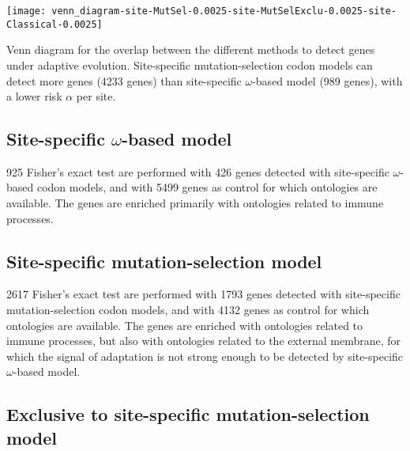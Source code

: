 \documentclass{article}
\renewcommand*{\bm}[1]{#1}%
\begin{document}
    \begin{center}
        \texttt{[image: venn\_diagram-site-MutSel-0.0025-site-MutSelExclu-0.0025-site-Classical-0.0025]}
    \end{center}
    Venn diagram for the overlap between the different methods to detect genes under adaptive evolution.
    Site-specific mutation-selection codon models can detect more genes (4233 genes) than site-specific $\omega$-based model (989 genes), with a lower risk $\alpha$ per site.

    \subsection{Site-specific $\bm{\omega}$-based model}
    \label{subsec:w-based-codon-method}
    925 Fisher's exact test are performed with 426 genes detected with site-specific $\omega$-based codon models, and with 5499 genes as control for which ontologies are available.
    The genes are enriched primarily with ontologies related to immune processes.

    

    \subsection{Site-specific mutation-selection model}
    \label{subsec:mutation-selection-codon-method}

    2617 Fisher's exact test are performed with 1793 genes detected with site-specific mutation-selection codon models, and with 4132 genes as control for which ontologies are available.
    The genes are enriched with ontologies related to immune processes, but also with ontologies related to the external membrane, for which the signal of adaptation is not strong enough to be detected by site-specific $\omega$-based model.

    

    \subsection{Exclusive to site-specific mutation-selection model}
    \label{subsec:exclusive-to-mutation-selection-codon-method}
\end{document}
